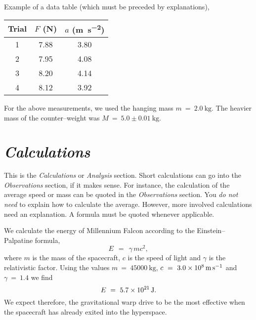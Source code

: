 \documentclass[epsfig,12pt]{article}
\begin{document}
	Example of a data table (which must be preceded by explanations),
\begin{center}
\begin{tabular}{ccc}
%
\toprule
%
	Trial	&	$ F $ (\si{\newton})	&	$ a $ (\si{\metre\per\square\second})	\\[2mm]
%
\midrule
%
	1	&	7.88	&	3.80	\\[2mm]
	2	&	7.95	&	4.08	\\[2mm]
	3	&	8.20	&	4.14	\\[2mm]
	4	&	8.12	&	3.92	\\[2mm]
%
\bottomrule
\end{tabular}
\end{center}
	For the above measurements, we used the hanging mass $ m ~=~ \SI{2.0}{\kg} $.
	The heavier mass of the counter--weight was $ M ~=~ 5.0 \pm \SI{0.01}{\kg} $.


\section*{\textit{Calculations}}

	This is the \textit{Calculations} or \textit{Analysis} section.
	Short calculations can go into the \textit{Observations} section, if it makes sense.
	For instance, the calculation of the average speed or mass can be quoted
	in the \textit{Observations} section.
	You \emph{do not need} to explain how to calculate the average.
	However, more involved calculations need an explanation.
	A formula must be quoted whenever applicable.

	We calculate the energy of Millennium Falcon according to the Einstein--Palpatine formula,
\[
	E  ~~=~~  \gamma\, m c^2,
\]
	where $ m $ is the mass of the spacecraft, $ c $ is the speed of light
	and $ \gamma $ is the relativistic factor.
	Using the values $ m ~=~ \SI{45000}{\kg} $, $ c ~=~ \SI{3.0d8}{\metre\per\second} $
	and $ \gamma ~=~ 1.4 $ we find
\[
 	E ~=~ \SI{5.7d21}{\joule}.
\]
	We expect therefore, the gravitational warp drive to be the most effective
	when the spacecraft has already exited into the hyperspace.
\end{document}
